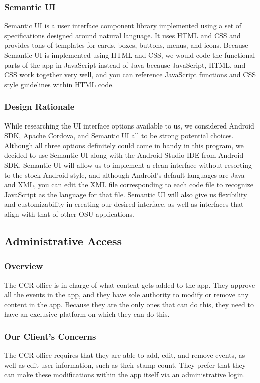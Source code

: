 \documentclass[draftclsnofoot, onecolumn, 10pt, compsoc]{IEEEtran}
\begin{document}
			\subsubsection{Semantic UI}
				Semantic UI is a user interface component library implemented using a set of specifications designed around natural language. It uses HTML and CSS and provides tons of templates for cards, boxes, buttons, menus, and icons. Because Semantic UI is implemented using HTML and CSS, we would code the functional parts of the app in JavaScript instead of Java because JavaScript, HTML, and CSS work together very well, and you can reference JavaScript functions and CSS style guidelines within HTML code.
				~\cite{Semantic_UI}
			\subsubsection{Design Rationale}
				While researching the UI interface options available to us, we considered Android SDK, Apache Cordova, and Semantic UI all to be strong potential choices. Although all three options definitely could come in handy in this program, we decided to use Semantic UI along with the Android Studio IDE from Android SDK. Semantic UI will allow us to implement a clean interface without resorting to the stock Android style, and although Android's default languages are Java and XML, you can edit the XML file corresponding to each code file to recognize JavaScript as the language for that file. Semantic UI will also give us flexibility and customizability in creating our desired interface, as well as interfaces that align with that of other OSU applications.
				~\cite{SemanticUI_JS}

		\subsection{Administrative Access}
			\subsubsection{Overview}
				The CCR office is in charge of what content gets added to the app. They approve all the events in the app, and they have sole authority to modify or remove any content in the app. Because they are the only ones that can do this, they need to have an exclusive platform on which they can do this.
			\subsubsection{Our Client's Concerns}
				The CCR office requires that they are able to add, edit, and remove events, as well as edit user information, such as their stamp count. They prefer that they can make these modifications within the app itself via an administrative login.
\end{document}

